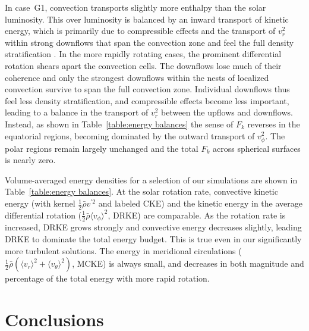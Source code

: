 In case~G1, convection transports slightly more enthalpy than
the solar luminosity.  This over luminosity is balanced by an inward
transport of kinetic energy, which is primarily due to compressible
effects and the transport of $v_r^2$ within strong downflows
that span the convection zone and feel the full density
stratification \citep{Hurlburt_et_al_1986}.  
In the more rapidly rotating cases, the prominent differential rotation
shears apart the convection cells.  The downflows
lose much of their coherence and only the strongest downflows within
the nests of localized convection survive to span the full
convection zone.  Individual downflows thus feel less density
stratification, and compressible effects become less important, leading
to a balance in the transport of $v_r^2$ between the upflows and
downflows.  Instead, as shown in Table~\ref{table:energy balances} the
sense of $F_k$ reverses in the equatorial regions,
becoming dominated by the outward transport of $v_\phi^2$.  The polar
regions remain largely unchanged and the total $F_k$ across spherical surfaces
is nearly zero.


Volume-averaged energy densities for a selection of our simulations
are shown in Table~\ref{table:energy balances}.  At the solar rotation
rate, convective kinetic energy (with kernel
$\frac{1}{2}\bar{\rho}v^{'2}$ and labeled CKE) and the kinetic energy in the
average differential rotation 
($\frac{1}{2}\bar{\rho}\langle v_\phi \rangle^2$, DRKE) are comparable.  As the
rotation rate is increased, DRKE grows strongly and convective energy
decreases slightly, leading DRKE to dominate the total energy budget.
This is true even in our significantly more turbulent solutions.  
The energy in meridional circulations ($\frac{1}{2}\bar{\rho}(\langle
v_r \rangle^2 + \langle v_\theta \rangle^2)$, MCKE) is always small,
and decreases in both magnitude and percentage of the total energy
with more rapid rotation. 



\section{Conclusions}
\label{sec:convection conclusion}

